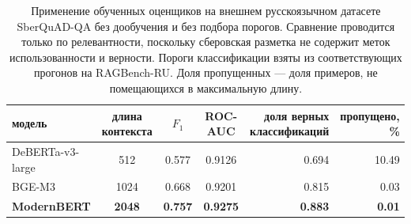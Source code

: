 \begin{table}[H]
\centering
\caption{Применение обученных оценщиков на внешнем русскоязычном датасете SberQuAD-QA без дообучения и без подбора порогов. Сравнение проводится только по релевантности, поскольку сберовская разметка не содержит меток использованности и верности. Пороги классификации взяты из соответствующих прогонов на RAGBench-RU. Доля пропущенных --- доля примеров, не помещающихся в максимальную длину.}
\label{tab:sberquadqa_leaderboard}
\footnotesize
\setlength{\tabcolsep}{4pt}
\renewcommand{\arraystretch}{1.15}
\begin{tabular}{lcccrr}
\toprule
модель & \makecell{длина\\контекста} & $F_1$ & ROC-AUC & \makecell{доля верных\\классификаций} & \makecell{пропущено,\\\%} \\
\midrule
DeBERTa-v3-large       & 512  & 0.577 & 0.9126 & 0.694 & 10.49 \\
BGE-M3                 & 1024 & 0.668 & 0.9201 & 0.815 & 0.03  \\
\textbf{ModernBERT}    & \textbf{2048} & \textbf{0.757} & \textbf{0.9275} & \textbf{0.883} & \textbf{0.01} \\
\bottomrule
\end{tabular}
\end{table}

